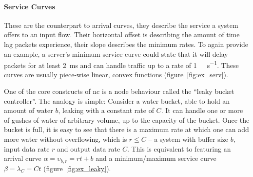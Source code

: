 \paragraph{Service Curves} These are the counterpart to arrival curves, they describe the service a system offers to an input flow.
Their horizontal offset is describing the amount of time lag packets experience, their slope describes the minimum rates. To again provide an example, a server's minimum service
curve could state that it will delay packets for at least \SI{2}{\milli\second} and can handle traffic up to a rate of \SI{1}{\giga\bit\per\second}.
These curves are usually piece-wise linear, convex functions (figure~\ref{fig:ex_serv}).
\par
One of the core constructs of \gls{nc} is a node behaviour called the \enquote{leaky bucket controller}. The analogy is simple: Consider a water bucket, able to hold an amount of water $b$, leaking with a constant rate of $C$.
It can handle one or more of gushes of water of arbitrary volume, up to the capacity of the bucket.
Once the bucket is full, it is easy to see that there is a maximum rate at which one can add more water without overflowing, which is $r \le C$ --
a system with buffer size $b$, input data rate $r$ and output data rate $C$. This is equivalent to featuring an arrival curve $\alpha = \upsilon_{b,r} = rt + b$ and a minimum/maximum service curve $\beta = \lambda_C = Ct$
(figure~\ref{fig:ex_leaky}).
%

